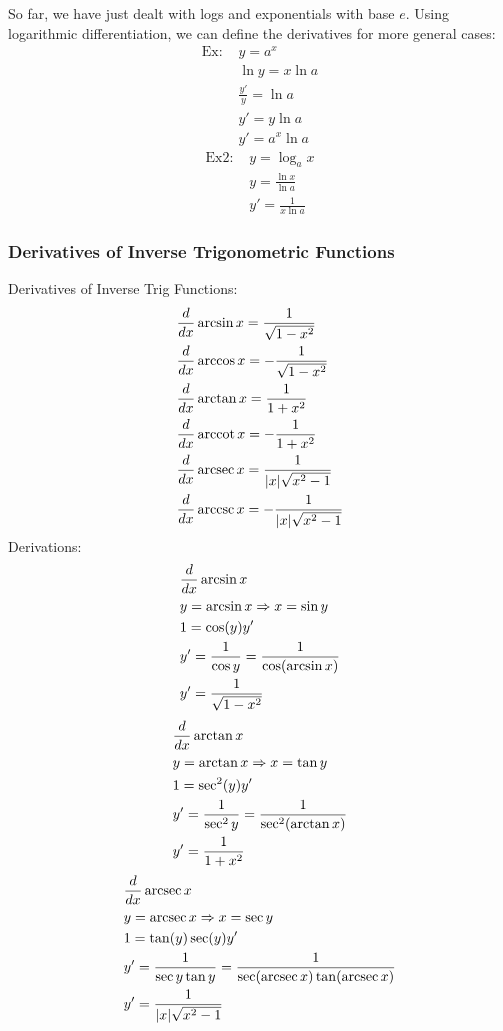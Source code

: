 \documentclass[11pt, fleqn]{article}
\begin{document}
So far, we have just dealt with logs and exponentials with base $e$. Using logarithmic differentiation, we can define the derivatives for more general cases:
\begin{align*}
    \text{Ex: }&y=a^x\\
    &\ln y=x\ln a\\
    &\frac{y'}{y}=\ln a\\
    &y'=y\ln a\\
    &y'=a^x\ln a
\end{align*}
\begin{align*}
    \text{Ex2: }&y=\log_ax\\
    &y=\frac{\ln x}{\ln a}\\
    &y'=\frac{1}{x\ln a}
\end{align*}

\subsubsection{Derivatives of Inverse Trigonometric Functions}
Derivatives of Inverse Trig Functions:
\begin{align*}
    &\frac{d}{dx}\arcsin x=\frac{1}{\sqrt{1-x^2}}\\
    &\frac{d}{dx}\arccos x=-\frac{1}{\sqrt{1-x^2}}\\
    &\frac{d}{dx}\arctan x=\frac{1}{1+x^2}\\
    &\frac{d}{dx}\operatorname{arccot} x=-\frac{1}{1+x^2}\\
    &\frac{d}{dx}\operatorname{arcsec} x=\frac{1}{|x|\sqrt{x^2-1}}\\
    &\frac{d}{dx}\operatorname{arccsc} x=-\frac{1}{|x|\sqrt{x^2-1}}
\end{align*}
Derivations:
\begin{align*}
    &\frac{d}{dx}\arcsin x\\
    &y=\arcsin x\Rightarrow x=\sin y\\
    &1=\cos (y)y'\\
    &y'=\frac{1}{\cos y}=\frac{1}{\cos(\arcsin x)}\\
    &y'=\frac{1}{\sqrt{1-x^2}}
\end{align*}
\begin{align*}
    &\frac{d}{dx}\arctan x\\
    &y=\arctan x\Rightarrow x=\tan y\\
    &1=\sec^2(y)y'\\
    &y'=\frac{1}{\sec^2y}=\frac{1}{\sec^2(\arctan x)}\\
    &y'=\frac{1}{1+x^2}
\end{align*}
\begin{align*}
    &\frac{d}{dx}\operatorname{arcsec} x\\
    &y=\operatorname{arcsec} x\Rightarrow x=\sec y\\
    &1=\tan(y)\sec(y)y'\\
    &y'=\frac{1}{\sec y\tan y}=\frac{1}{\sec(\operatorname{arcsec} x)\tan(\operatorname{arcsec} x)}\\
    &y'=\frac{1}{|x|\sqrt{x^2-1}}
\end{align*}
\end{document}

